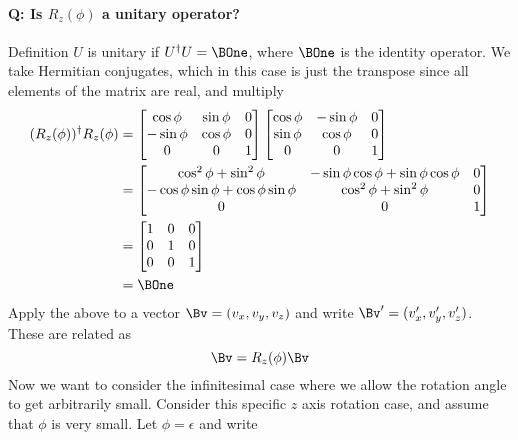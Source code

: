 \paragraph{Q: Is \(R_z(\phi)\) a unitary operator?}
%
Definition \(U\) is unitary if \(U^\dagger U = \BOne\), where \(\BOne\) is the identity operator.  We take Hermitian conjugates, which in this case is just the transpose since all elements of the matrix are real, and multiply
%
\begin{equation}\label{eqn:lecture12rotationsAndAngularMomentum:240}
\begin{aligned}
(R_z(\phi))^\dagger R_z(\phi) &=
\begin{bmatrix}
\cos \phi & \sin\phi & 0 \\
-\sin \phi & \cos\phi & 0 \\
0 & 0 & 1
\end{bmatrix}
\begin{bmatrix}
\cos \phi &- \sin\phi & 0 \\
\sin \phi & \cos\phi & 0 \\
0 & 0 & 1
\end{bmatrix} \\
&=
\begin{bmatrix}
\cos^2 \phi + \sin^2\phi  & -\sin\phi \cos\phi  + \sin\phi \cos\phi  & 0 \\
-\cos\phi \sin\phi  + \cos\phi \sin\phi  & \cos^2\phi  + \sin^2 \phi & 0 \\
0 & 0 & 1 \\
\end{bmatrix} \\
&=
\begin{bmatrix}
1 & 0 & 0 \\
0 & 1 & 0 \\
0 & 0 & 1 \\
\end{bmatrix} \\
&= \BOne
\end{aligned}
\end{equation}
%
Apply the above to a vector \(\Bv = (v_x, v_y, v_z)\) and write \(\Bv' = (v_x', v_y', v_z')\).  These are related as
%
\begin{equation}\label{eqn:PHY356FDec7:40}
\Bv = R_z(\phi) \Bv
\end{equation}
%
Now we want to consider the infinitesimal case where we allow the rotation angle to get arbitrarily small.  Consider this specific \(z\) axis rotation case, and assume that \(\phi\) is very small.  Let \(\phi = \epsilon\) and write
%
